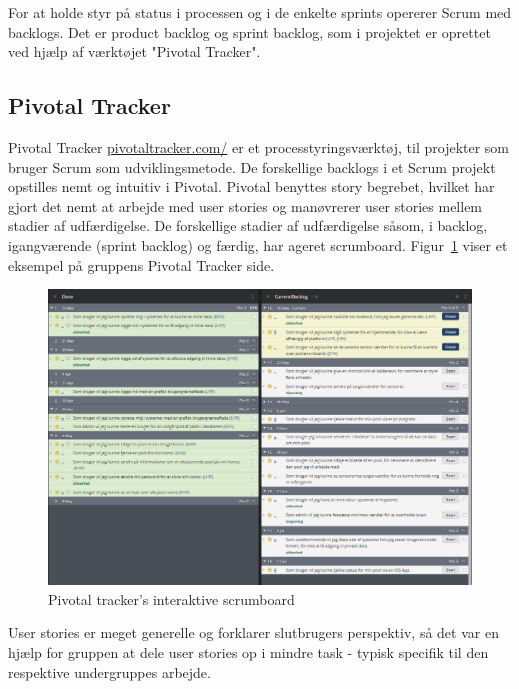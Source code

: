 For at holde styr på status i processen og i de enkelte sprints opererer Scrum med backlogs. Det er product backlog og sprint backlog, som i projektet er oprettet ved hjælp af værktøjet "Pivotal Tracker". 

\subsection{Pivotal Tracker}
Pivotal Tracker \url{pivotaltracker.com/} er et processtyringsværktøj, til projekter som bruger Scrum som udviklingsmetode. De forskellige backlogs i et Scrum projekt opstilles nemt og intuitiv i Pivotal. Pivotal benyttes story begrebet, hvilket har gjort det nemt at arbejde med user stories og manøvrerer user stories mellem stadier af udfærdigelse. De forskellige stadier af udfærdigelse såsom, i backlog, igangværende (sprint backlog) og færdig, har ageret scrumboard. 
 Figur~\ref{fig:scrumboard} viser et eksempel på gruppens Pivotal Tracker side.

\begin{figure}
	\centering
	\includegraphics[width=\linewidth]{figs/processProjektGennemforsel/scrumboard.PNG}
	\caption{Pivotal tracker's interaktive scrumboard}
	\label{fig:scrumboard}
\end{figure}

 User stories er meget generelle og forklarer slutbrugers perspektiv, så det var en hjælp for gruppen at dele user stories op i mindre task - typisk specifik til den respektive undergruppes arbejde. 

